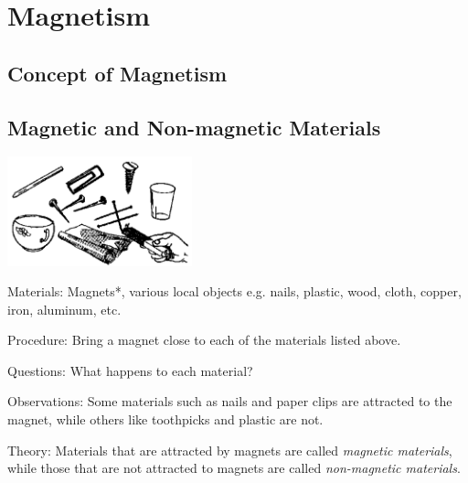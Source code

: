 \section{Magnetism}

\begin{multicols}{2}


\section*{Concept of Magnetism}


\subsection{Magnetic and Non-magnetic Materials}

\begin{center}
\includegraphics[width=0.4\textwidth]{./img/source/mag-non-mag.png}
\end{center}

\begin{description*}
\item[Materials:]{Magnets*, various local objects e.g. nails, plastic, wood, cloth, copper, iron, aluminum, etc.}
\item[Procedure:]{Bring a magnet close to each of the materials listed above.}
\item[Questions:]{What happens to each material?}
\item[Observations:]{Some materials such as nails and paper clips are attracted to the magnet, while others like toothpicks and plastic are not.}
\item[Theory:]{Materials that are attracted by magnets are called \emph{magnetic materials}, while those that are not attracted to magnets are called \emph{non-magnetic materials}.}
\end{description*}


\end{multicols}
